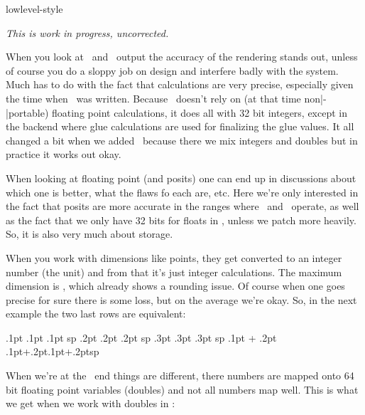 
\environment lowlevel-style

\startdocument
  [title=accuracy,
   color=darkgray]

\startsectionlevel[title=Introduction]

{\em This is work in progress, uncorrected.}

When you look at \TEX\ and \METAPOST\ output the accuracy of the rendering stands
out, unless of course you do a sloppy job on design and interfere badly with the
system. Much has to do with the fact that calculations are very precise,
especially given the time when \TEX\ was written. Because \TEX\ doesn't rely on
(at that time non|-|portable) floating point calculations, it does all with 32
bit integers, except in the backend where glue calculations are used for
finalizing the glue values. It all changed a bit when we added \LUA\ because
there we mix integers and doubles but in practice it works out okay.

When looking at floating point (and posits) one can end up in discussions about
which one is better, what the flaws fo each are, etc. Here we're only interested
in the fact that posits are more accurate in the ranges where \TEX\ and
\METAPOST\ operate, as well as the fact that we only have 32 bits for floats in
\TEX, unless we patch more heavily. So, it is also very much about storage.

When you work with dimensions like points, they get converted to an integer
number (the  unit) and from that it's just integer calculations. The
maximum dimension is \the\maxdimen, which already shows a rounding issue. Of
course when one goes precise for sure there is some loss, but on the average
we're okay. So, in the next example the two last rows are equivalent:

\starttabulate[|Tr|r|r|]
\NC .1pt        \NC \the\dimexpr.1pt     \relax  \NC \number\dimexpr.1pt     \relax sp \NC \NR
\NC .2pt        \NC \the\dimexpr.2pt     \relax  \NC \number\dimexpr.2pt     \relax sp \NC \NR
\NC .3pt        \NC \the\dimexpr.3pt     \relax  \NC \number\dimexpr.3pt     \relax sp \NC \NR
\NC .1pt + .2pt \NC \the\dimexpr.1pt+.2pt\relax  \NC \number\dimexpr.1pt+.2pt\relax sp \NC \NR
\stoptabulate

When we're at the \LUA\ end things are different, there numbers are mapped onto
64 bit floating point variables (doubles) and not all numbers map well. This is
what we get when we work with doubles in \LUA:

